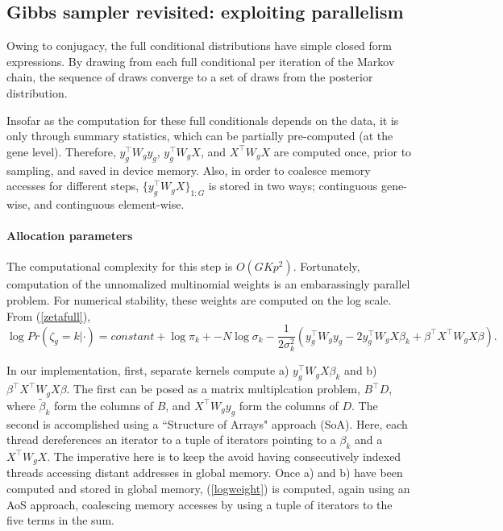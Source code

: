\subsection{Gibbs sampler revisited: exploiting parallelism}
\label{subsec:gibbs-revisited}
Owing to conjugacy, the full conditional distributions have simple closed form expressions. By drawing from each full conditional per iteration of the Markov chain, the sequence of draws converge to a set of draws from the posterior distribution.

Insofar as the computation for these full conditionals depends on the data, it is only through summary statistics, which can be partially pre-computed (at the gene level). Therefore, $y_g^\top W_g y_g$, $y_g^\top W_g X$, and $X^\top W_g X$ are computed once, prior to sampling, and saved in device memory. Also, in order to coalesce memory accesses for different steps, $\{y_g^\top W_g X\}_{1:G}$ is stored in two ways; continguous gene-wise, and continguous
element-wise.

\paragraph{Allocation parameters}
The computational complexity for this step is $O(GKp^2)$. Fortunately, computation of the unnomalized multinomial weights is an embarassingly parallel problem. For numerical stability, these weights are computed on the log scale. From (\ref{zetafull}),
\begin{equation}
\label{logweight}
\log Pr(\zeta_g=k|\cdot) = constant + \log \pi_k + -N \log \sigma_k - \frac{1}{2\sigma^2_k}\left(y_g^\top W_g y_g - 2y_g^\top W_g X \beta_k + \beta^\top X^\top W_g X \beta \right).
\end{equation}

In our implementation, first, separate kernels compute a) $y_g^\top W_g X \beta_k$ and b) $\beta^\top X^\top W_g X \beta$. The first can be posed as a matrix multiplcation problem, $B^\top D$, where $\tilde{\beta}_k$ form the columns of $B$, and $X^\top W_g y_g$ form the columns of $D$. The second is accomplished using a ``Structure of Arrays" approach (SoA). Here, each thread dereferences an iterator to a tuple of iterators pointing to a $\beta_k$ and a $X^\top W_g X$. The imperative here is to keep the avoid having consecutively indexed threads accessing distant addresses in global memory. Once a) and b) have been computed and stored in global memory, (\ref{logweight}) is computed, again using an AoS approach, coalescing memory accesses by using a tuple of iterators to the five terms in the sum.

